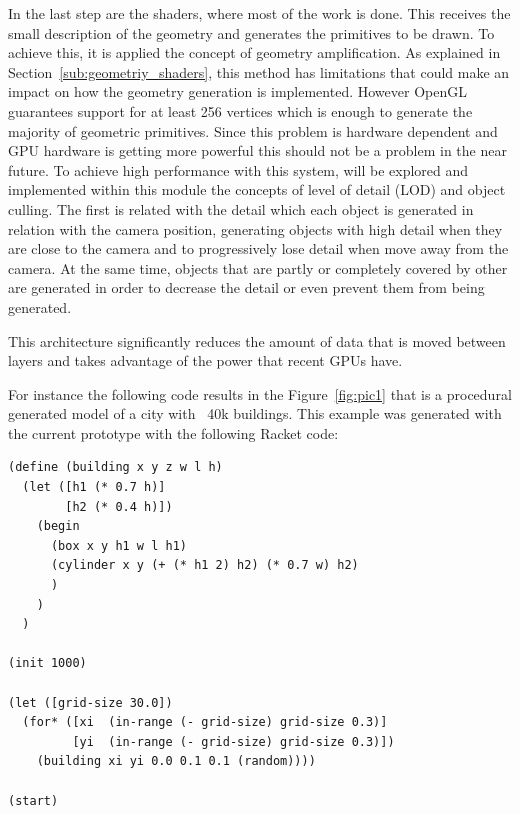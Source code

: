 In the last step are the shaders, where most of the work is done. This receives the small description of the geometry and generates the primitives to be drawn. To achieve this, it is applied the concept of geometry amplification. As explained in Section~\ref{sub:geometriy_shaders}, this method has limitations that could make an impact on how the geometry generation is implemented. However OpenGL guarantees support for at least 256 vertices which is enough to generate the majority of geometric primitives. Since this problem is hardware dependent and GPU hardware is getting more powerful this should not be a problem in the near future. 
To achieve high performance with this system, will be explored and implemented within this module the concepts of level of detail (LOD) and object culling. The first is related with the detail which each object is generated in relation with the camera position, generating  objects with high detail when they are close to the camera and to progressively lose detail when move away from the camera.  At the same time, objects that are partly or completely covered by other are generated in order to decrease the detail or even prevent them from being generated.

This architecture significantly reduces the amount of data that is moved between layers and takes advantage of the power that recent GPUs have.

For instance the following code results in the Figure~\ref{fig:pic1} that is a procedural generated model of a city with ~40k buildings. This example was generated with the current prototype with the following Racket code:



\lstset{style=racket}
\begin{absolutelynopagebreak}
\begin{lstlisting}
(define (building x y z w l h)
  (let ([h1 (* 0.7 h)]
        [h2 (* 0.4 h)])
    (begin
      (box x y h1 w l h1)
      (cylinder x y (+ (* h1 2) h2) (* 0.7 w) h2)
      )
    )
  )

(init 1000)

(let ([grid-size 30.0])
  (for* ([xi  (in-range (- grid-size) grid-size 0.3)]
         [yi  (in-range (- grid-size) grid-size 0.3)])
    (building xi yi 0.0 0.1 0.1 (random))))

(start)
\end{lstlisting}
\end{absolutelynopagebreak}

